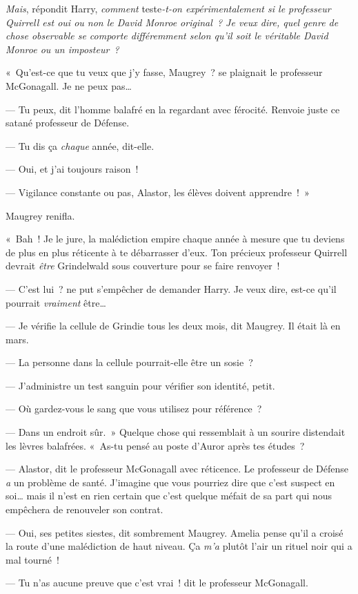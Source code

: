 \emph{Mais}, répondit Harry, \emph{comment} teste\emph{-t-on expérimentalement si le professeur Quirrell est oui ou non le David Monroe original~? Je veux dire, quel genre de chose observable se comporte différemment selon qu'il soit le véritable David Monroe ou un imposteur~?}

«~Qu'est-ce que tu veux que j'y fasse, Maugrey~? se plaignait le professeur McGonagall. Je ne peux pas…

--- Tu peux, dit l'homme balafré en la regardant avec férocité. Renvoie juste ce satané professeur de Défense.

--- Tu dis ça \emph{chaque} année, dit-elle.

--- Oui, et j'ai toujours raison~!

--- Vigilance constante ou pas, Alastor, les élèves doivent apprendre~!~»

Maugrey renifla.

«~Bah~! Je le jure, la malédiction empire chaque année à mesure que tu deviens de plus en plus réticente à te débarrasser d'eux. Ton précieux professeur Quirrell devrait \emph{être} Grindelwald sous couverture pour se faire renvoyer~!

--- C'est lui~? ne put s'empêcher de demander Harry. Je veux dire, est-ce qu'il pourrait \emph{vraiment} être…

--- Je vérifie la cellule de Grindie tous les deux mois, dit Maugrey. Il était là en mars.

--- La personne dans la cellule pourrait-elle être un sosie~?

--- J'administre un test sanguin pour vérifier son identité, petit.

--- Où gardez-vous le sang que vous utilisez pour référence~?

--- Dans un endroit sûr.~» Quelque chose qui ressemblait à un sourire distendait les lèvres balafrées. «~As-tu pensé au poste d'Auror après tes études~?

--- Alastor, dit le professeur McGonagall avec réticence. Le professeur de Défense \emph{a} un problème de santé. J'imagine que vous pourriez dire que c'est suspect en soi… mais il n'est en rien certain que c'est quelque méfait de sa part qui nous empêchera de renouveler son contrat.

--- Oui, ses petites siestes, dit sombrement Maugrey. Amelia pense qu'il a croisé la route d'une malédiction de haut niveau. Ça \emph{m'a} plutôt l'air un rituel noir qui a mal tourné~!

--- Tu n'as aucune preuve que c'est vrai~! dit le professeur McGonagall.

